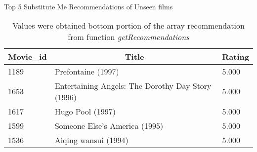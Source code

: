 \begin{table}[!htbp]
	\caption{Top 5 Substitute Me Recommendations of Unseen films} \label{tab:top-unseen}
	\begin{center}
	\vspace{-5mm}
		\begin{tabular}{ l l l }
			\hline
			\multicolumn{1}{c}{Movie\_id} & \multicolumn{1}{c}{Title} & \multicolumn{1}{c}{Rating}\\
			\hline
			1189   & Prefontaine (1997)                                &     5.000\\
			1653   & Entertaining Angels: The Dorothy Day Story (1996) &     5.000\\
			1617   & Hugo Pool (1997)                                  &     5.000\\
			1599   & Someone Else's America (1995)                     &     5.000\\
			1536   & Aiqing wansui (1994)                              &     5.000\\
			\hline
		\end{tabular}
	\caption*{\scriptsize Values were obtained bottom portion of the array recommendation from function \textit{getRecommendations}}
	 \end{center}
\end{table}